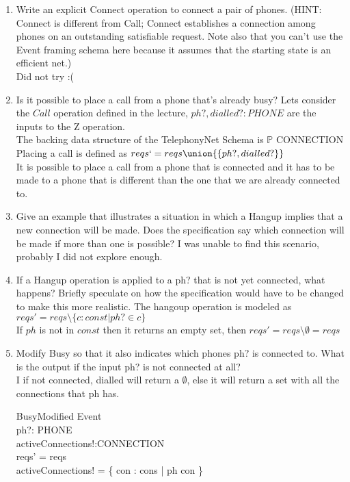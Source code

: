 \documentclass{article}
\begin{document}
\begin{enumerate}
\begin{enumerate}
\item Write an explicit Connect operation to connect a pair of
phones. (HINT: Connect is different from Call; Connect establishes
a connection among phones on an outstanding satisfiable request. Note also that you can't use the Event framing schema here because it assumes that the starting state is an efficient net.) \\
\color{blue}
Did not try :(
\color{black}
\item Is it possible to place a call from a phone that's already
  busy?
  \color{blue}
  Lets consider the $Call$ operation defined in the lecture, $ph?, dialled? : PHONE$ are the inputs to the Z operation. \\
  The backing data structure of the TelephonyNet Schema is $\mathbb{P}$ CONNECTION \\
  Placing a call is defined as $reqs`= reqs \union \{\{ ph?,dialled? \}\} $ \\
  It is possible to place a call from a phone that is connected and it has to be made to a phone that is different than the one that we are already connected to. \\
  \color{black}
\item Give an example that illustrates a situation in which a
Hangup implies that a new connection will be made. Does the
specification say which connection will be made if more than one
is possible?
\color{blue}
I was unable to find this scenario, probably I did not explore enough. \\
\color{black}
\item If a Hangup operation is applied to a ph? that is not yet
connected, what happens? Briefly speculate on how the
specification would have to be changed to make this more
realistic.
\color{blue}
The hangoup operation is modeled as $reqs' = reqs \setminus \{ c : const \vert ph? \in c \}$ \\
If $ph$ is not in $const$ then it returns an empty set, then $ reqs' = reqs \setminus \emptyset = reqs $  
\color{black}
\item Modify Busy so that it also indicates which phones ph? is
connected to. What is the output if the input ph? is not connected
at all? \\
\color{blue}
I if not connected, dialled will return a $\emptyset$, else it will return a set with all the connections that ph has. \\
\begin{schema}{BusyModified}
   Event \\
   ph?: PHONE \\
   activeConnections!:CONNECTION \\
   \where
   reqs' = reqs \\
   activeConnections! = \{ con : cons | ph \in con \}
   \end{schema}
\color{black}


\end{enumerate}
\end{enumerate}
\end{document}
